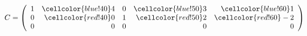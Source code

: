 \documentclass[border=1pt]{standalone}
\begin{document}
\thispagestyle{empty}
$
C=\left(\begin{array}{rrrrr}
1 & \cellcolor{blue!40}4 & 0 & \cellcolor{blue!50}3 & \cellcolor{blue!60}1 \\
0 & \cellcolor{red!40}0 & 1 & \cellcolor{red!50}2 &\cellcolor{red!60} -2 \\
0 & 0 & 0 & 0 & 0
\end{array}\right)
$
\end{document}
